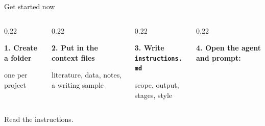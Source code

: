 \documentclass[aspectratio=169,11pt]{beamer}
\newcommand{\prompt}[1]{\begin{promptbox}\textcolor{accent}{\faCommentDots}\enspace #1\end{promptbox}}
\newcommand{\file}[1]{\texttt{#1}}
\newcommand{\icon}[1]{\textcolor{accent}{#1}}
\begin{document}
\begin{frame}{Get started now}
  \begin{columns}[T]
    \begin{column}{0.22\textwidth}
      \centering
      \parbox[c][1.3cm][c]{\linewidth}{\centering\Huge\icon{\faFolderPlus}}\par
      \textbf{1. Create a folder}\par\smallskip
      {\small one per project}
    \end{column}
    \begin{column}{0.22\textwidth}
      \centering
      \parbox[c][1.3cm][c]{\linewidth}{\centering\Huge\icon{\faCopy}}\par
      \textbf{2. Put in the context files}\par\smallskip
      {\small literature, data, notes, a writing sample}
    \end{column}
    \begin{column}{0.22\textwidth}
      \centering
      \parbox[c][1.3cm][c]{\linewidth}{\centering\Huge\icon{\faFileSignature}}\par
      \textbf{3. Write \file{instructions.md}}\par\smallskip
      {\small scope, output, stages, style}
    \end{column}
    \begin{column}{0.22\textwidth}
      \centering
      \parbox[c][1.3cm][c]{\linewidth}{\centering\Huge\icon{\faPlay}}\par
      \textbf{4. Open the agent and prompt:}
    \end{column}
  \end{columns}
  \vspace{1.5em}
  \begin{center}
    \begin{minipage}{0.5\textwidth}
      \prompt{\normalsize Read the instructions.}
    \end{minipage}
  \end{center}
\end{frame}
\end{document}
